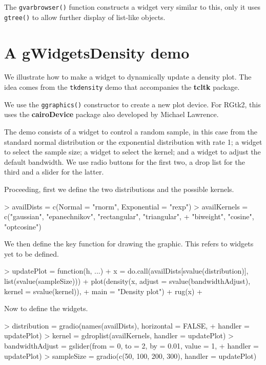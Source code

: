 \documentclass[12pt]{article}
\newcommand{\RCode}[1]{\texttt{#1}}
\newcommand{\RFunc}[1]{\texttt{#1()}}
\newcommand{\RPackage}[1]{\textbf{#1}}
\begin{document}
The \RFunc{gvarbrowser} function constructs a widget very similar to
this, only it uses \RFunc{gtree} to allow further display of
list-like objects.


\section{A gWidgetsDensity demo}
\label{sec:repeating-plot}

We illustrate how to make a widget to dynamically update a density
plot. The idea comes from the \RCode{tkdensity} demo that accompanies
the \RPackage{tcltk} package.

We use the  \RFunc{ggraphics} constructor to create a new plot device. For
RGtk2, this uses the \RPackage{cairoDevice} package also developed
by Michael Lawrence.

The demo consists of a widget to control a random sample, in this case
from the standard normal distribution or the exponential distribution
with rate 1; a widget to select the sample size; a widget to select the
kernel; and a widget to adjust the default bandwidth. We use radio
buttons for the first two, a drop list for the third and a slider for
the latter.

Proceeding, first we define the two distributions and the possible kernels.
\begin{Schunk}
\begin{Sinput}
> availDists = c(Normal = "rnorm", Exponential = "rexp")
> availKernels = c("gaussian", "epanechnikov", "rectangular", "triangular", 
+     "biweight", "cosine", "optcosine")
\end{Sinput}
\end{Schunk}

We then define the key function for drawing the graphic. This refers
to widgets yet to be defined.
                      
\begin{Schunk}
\begin{Sinput}
> updatePlot = function(h, ...) {
+     x = do.call(availDists[svalue(distribution)], list(svalue(sampleSize)))
+     plot(density(x, adjust = svalue(bandwidthAdjust), kernel = svalue(kernel)), 
+         main = "Density plot")
+     rug(x)
+ }
\end{Sinput}
\end{Schunk}
Now to define the widgets.
\begin{Schunk}
\begin{Sinput}
> distribution = gradio(names(availDists), horizontal = FALSE, 
+     handler = updatePlot)
> kernel = gdroplist(availKernels, handler = updatePlot)
> bandwidthAdjust = gslider(from = 0, to = 2, by = 0.01, value = 1, 
+     handler = updatePlot)
> sampleSize = gradio(c(50, 100, 200, 300), handler = updatePlot)
\end{Sinput}
\end{Schunk}
\end{document}
